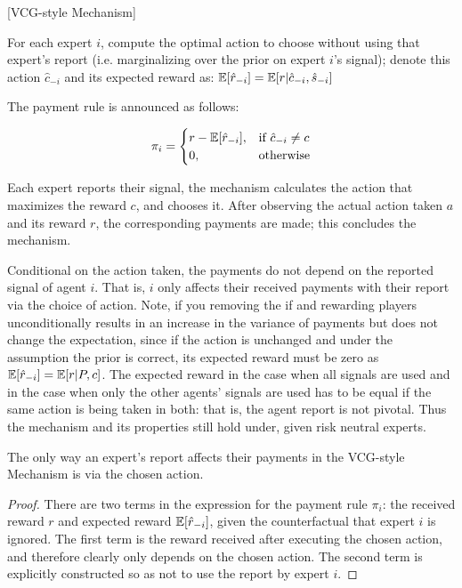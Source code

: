 \begin{mech}\label{mech:vcg-style}[VCG-style Mechanism]



For each expert $i$, compute the optimal action to choose without using that expert's report (i.e. marginalizing over the prior on expert $i$'s signal); denote this action $\hat{c}_{-i}$ and its expected reward as: $\operatorname*{\mathbb E}[\hat{r}_{-i}] = \operatorname*{\mathbb E}[ r| \hat{c}_{-i}, \hat{s}_{-i}] $


The payment rule is announced as follows:

\[
    \pi_i = 
\begin{cases}
    r - \expec[\hat{r}_{-i}] ,& \text{if } \hat{c}_{-i} \neq c\\
    0,              & \text{otherwise}
\end{cases}
\]

%

Each expert reports their signal, the mechanism calculates the action that maximizes the reward $c$, and chooses it. After observing the actual action taken $a$ and its reward $r$, the corresponding payments are made; this concludes the mechanism.

\end{mech}


Conditional on the action taken, the payments do not depend on the reported signal of agent $i$.
That is, $i$ only affects their received payments with their report via the choice of action. 
Note, if you removing the if and rewarding players unconditionally results in an increase in the variance of payments but does not change the expectation, since if the action is unchanged and under the assumption the prior is correct, its expected reward must be zero as $\operatorname*{\mathbb E}[\hat{r}_{-i}] = \operatorname*{\mathbb E}[r|P,c]$. 
The expected reward in the case when all signals are used and in the case when only the other agents' signals are used has to be equal if the same action is being taken in both: that is, the agent report is not pivotal. 
Thus the mechanism and its properties still hold under, given risk neutral experts. 


\begin{lem}\label{lem:affect}
	The only way an expert's report affects their payments in the VCG-style Mechanism is via the chosen action.
\end{lem}

\begin{proof}
There are two terms in the expression for the payment rule $\pi_i$: the received reward $r$ and expected reward $\operatorname*{\mathbb E}[\hat{r}_{-i}]$, given the counterfactual that expert $i$ is ignored. 
The first term is the reward received after executing the chosen action, and therefore clearly only depends on the chosen action. 
The second term is explicitly constructed so as not to use the report by expert $i$. 
\end{proof}



